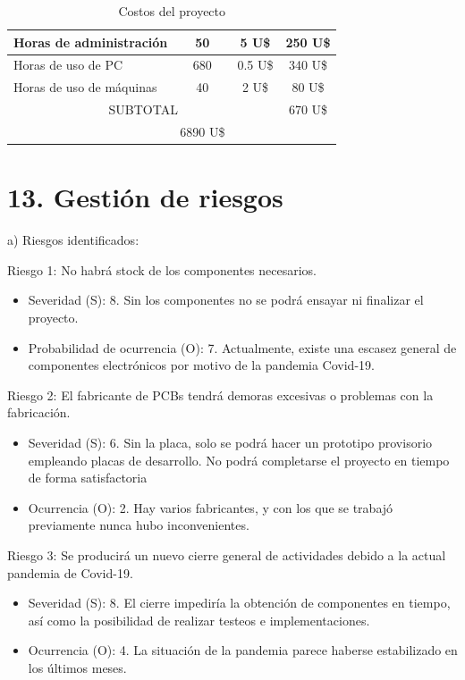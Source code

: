 \documentclass[
11pt, %
]{charter}
\begin{document}
\begin{table}[htpb]
\begin{tabularx}{\linewidth}{@{}|X|c|r|r|@{}}
Horas de administración &
  \multicolumn{1}{c|}{50} &
  \multicolumn{1}{c|}{5 U\$} &
  \multicolumn{1}{c|}{250 U\$} \\ \hline 

Horas de uso de PC &
  \multicolumn{1}{c|}{680} &
  \multicolumn{1}{c|}{0.5 U\$} &
  \multicolumn{1}{c|}{340 U\$} \\ \hline 
  
Horas de uso de máquinas &
  \multicolumn{1}{c|}{40} &
  \multicolumn{1}{c|}{2 U\$} &
  \multicolumn{1}{c|}{80 U\$} \\ \hline 

\multicolumn{3}{|c|}{SUBTOTAL} &
  \multicolumn{1}{c|}{670 U\$} \\ \hline
\rowcolor[HTML]{C0C0C0}
\multicolumn{3}{|c|}{TOTAL} &
\multicolumn{1}{c|}{6890 U\$}
   \\ \hline
\end{tabularx}%
\caption{Costos del proyecto}
\label{tab:costosProyecto}
\end{table}


\section{13. Gestión de riesgos}
\label{sec:riesgos}

a) Riesgos identificados:

Riesgo 1: No habrá stock de los componentes necesarios.
\begin{itemize}
	\item Severidad (S): 8. Sin los componentes no se podrá ensayar ni finalizar el proyecto.
	\item Probabilidad de ocurrencia (O): 7. Actualmente, existe una escasez general de componentes electrónicos por motivo de la pandemia Covid-19. 
\end{itemize}   

Riesgo 2: El fabricante de PCBs tendrá demoras excesivas o problemas con la fabricación.
\begin{itemize}
	\item Severidad (S): 6. Sin la placa, solo se podrá hacer un prototipo provisorio empleando placas de desarrollo. No podrá completarse el proyecto en tiempo de forma satisfactoria
	\item Ocurrencia (O): 2. Hay varios fabricantes, y con los que se trabajó previamente nunca hubo inconvenientes.
\end{itemize}

Riesgo 3: Se producirá un nuevo cierre general de actividades debido a la actual pandemia de Covid-19.
\begin{itemize}
	\item Severidad (S): 8. El cierre impediría la obtención de componentes en tiempo, así como la posibilidad de realizar testeos e implementaciones.
	\item Ocurrencia (O): 4. La situación de la pandemia parece haberse estabilizado en los últimos meses.
\end{itemize}
\end{document}
